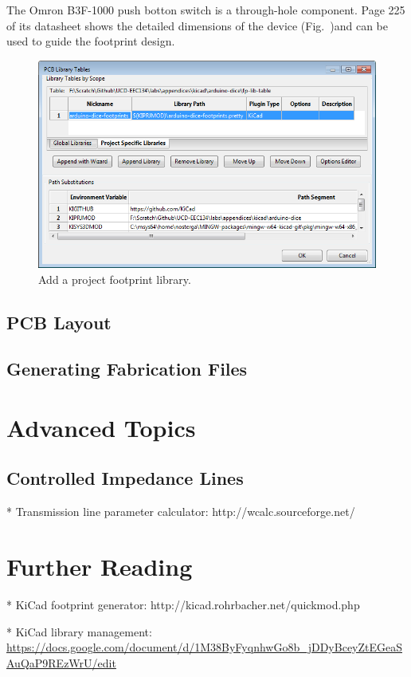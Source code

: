 \documentclass[12pt,letterpaper]{scrartcl}
\begin{document}
The Omron B3F-1000 push botton switch is a through-hole component. Page 225 of its datasheet shows the detailed dimensions of the device (Fig.~)and can be used to guide the footprint design.  

	\begin{figure}[h]
		\centering
		\includegraphics[width=5in]{add-project-footprint-lib}
		\caption{Add a project footprint library.}
		\label{fig:add-project-footprint-lib}
	\end{figure}

\subsection{PCB Layout}




\subsection{Generating Fabrication Files}

\section{Advanced Topics}

\subsection{Controlled Impedance Lines}

* Transmission line parameter calculator: http://wcalc.sourceforge.net/

\section{Further Reading}

* KiCad footprint generator: http://kicad.rohrbacher.net/quickmod.php

* KiCad library management: \url{https://docs.google.com/document/d/1M38ByFyqnhwGo8b_jDDyBceyZtEGeaSAuQaP9REzWrU/edit}


\newpage



\end{document}
